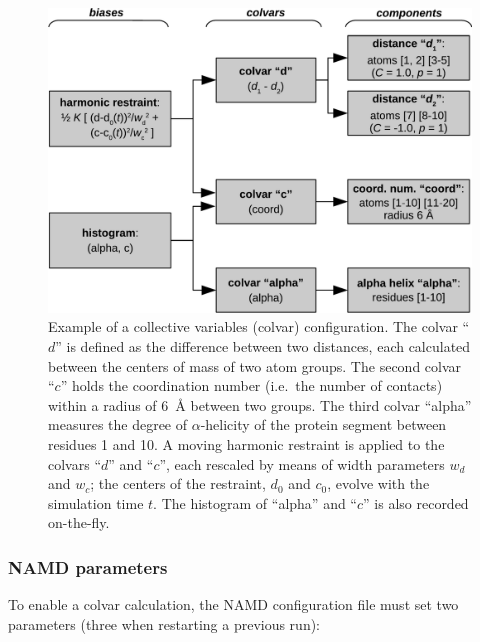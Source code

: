 \begin{figure}[!ht]
  \centering
  \includegraphics[width=12cm]{figures/colvars_diagram}
  \caption{Example of a collective variables (colvar) configuration.
    The colvar ``$d$'' is defined as the difference between two
    distances, each calculated between the centers of mass of two
    atom groups.  The second colvar ``$c$'' holds the coordination
    number (i.e.~the number of contacts) within a radius of 6~\AA{}
    between two groups.  The third colvar ``alpha'' measures the
    degree of $\alpha$-helicity of the protein segment between
    residues 1 and 10. A moving harmonic restraint is applied to the
    colvars ``$d$'' and ``$c$'', each rescaled by means of width
    parameters $w_{d}$ and $w_{c}$; the centers of the restraint,
    $d_0$ and $c_0$, evolve with the simulation time $t$.  The
    histogram of ``alpha'' and ``$c$'' is also recorded on-the-fly.}
  \label{fig:colvars_diagram}
\end{figure}


\subsubsection{NAMD parameters}

To enable a colvar calculation, the NAMD configuration file must
set two parameters (three when restarting a previous run):

